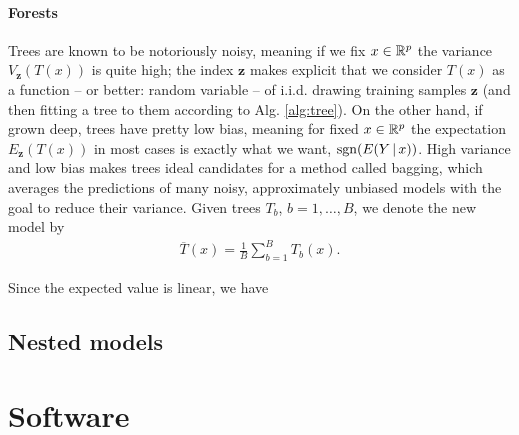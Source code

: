 \paragraph{Forests}
Trees are known to be notoriously noisy, meaning if we fix $x \in \mathbb{R}^p$ the variance 
$V_\mathbf{z}(T(x))$ is quite high; the index $\mathbf{z}$ makes explicit that we consider $T(x)$ as 
a function -- or better: random variable -- of i.i.d. drawing training samples $\mathbf{z}$ (and 
then fitting a tree to them according to Alg. \ref{alg:tree}). On the other hand, if grown deep,
trees have pretty low bias, meaning for fixed $x \in \mathbb{R}^p$ the expectation $E_\mathbf{z}(T(x))$ in 
most cases is exactly what we want, $\mathrm{sgn}(E(Y \,|\, x))$. High variance and low bias makes trees 
ideal candidates for a method called bagging, which averages the predictions of many noisy, 
approximately unbiased models with the goal to reduce their variance. Given trees $T_b$, $b = 1, 
\ldots, B$, we denote the new model by 
\begin{align}
    \overline{T}(x) = \frac{1}{B} \sum_{b=1}^B T_b(x).
\end{align}

Since the expected value is linear, we have 


\subsection{Nested models}\label{subsec:nested-models}

\section{Software}